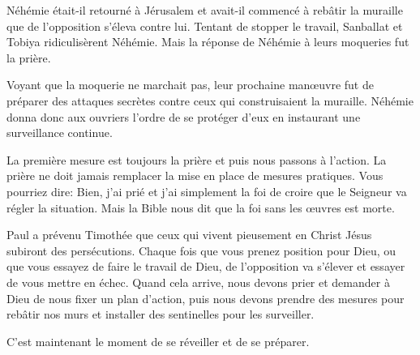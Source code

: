 


 Néhémie était-il retourné à Jérusalem
 et avait-il commencé à rebâtir la muraille que de l'opposition
 s'éleva contre lui.
 Tentant de stopper le travail, Sanballat et Tobiya ridiculisèrent Néhémie.
 Mais la réponse de Néhémie à leurs moqueries fut la prière.

Voyant que la moquerie ne marchait pas, leur prochaine manœuvre
 fut de préparer des attaques secrètes contre ceux qui construisaient
 la muraille.
 Néhémie donna donc aux ouvriers l'ordre de se protéger d'eux en instaurant
 une surveillance continue.

La première mesure est toujours la prière \ocadr{}et puis nous passons à l'action.
 La prière ne doit jamais remplacer la mise en place de mesures pratiques.
 Vous pourriez dire\space:
 \og Bien, j'ai prié et j'ai simplement la foi de croire que le Seigneur
 va régler la situation. \fg{}
 Mais la Bible nous dit que la foi sans les œuvres est morte.


Paul a prévenu Timothée que ceux qui vivent pieusement en Christ Jésus
 subiront des persécutions.
 Chaque fois que vous prenez position pour Dieu,
 ou que vous essayez de faire le travail de Dieu,
 de l'opposition va s'élever et essayer de vous mettre en échec.
 Quand cela arrive, nous devons prier et demander à Dieu de nous fixer
 un plan d'action, puis nous devons prendre des mesures pour rebâtir
 nos murs et installer des sentinelles pour les surveiller.

C'est maintenant le moment de se réveiller et de se préparer. 


\dvrule






